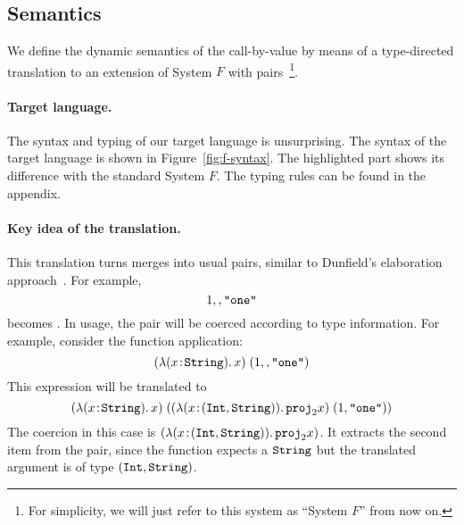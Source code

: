 \subsection{Semantics}

We define the dynamic semantics of the call-by-value \name by means of
a type-directed translation to an extension of System $F$ with pairs~\footnote{
  For simplicity, we will just refer to this system as ``System $F$''
  from now on.}.


\paragraph{Target language.}
The syntax and typing of our target language is unsurprising. The syntax of the
target language is shown in Figure~\ref{fig:f-syntax}. The highlighted part
shows its difference with the standard System $F$. The typing rules can be found
in the appendix.

\paragraph{Key idea of the translation.}
This translation turns merges into usual pairs, similar to Dunfield's
elaboration approach~\cite{dunfield2014elaborating}.
For example, \[ 1 ,, \texttt{"one"} \] becomes 
{}. In usage, the pair will be coerced according to type
information. For example, consider the function application: \[ (\lambda (x \!:\! \texttt{String}).\, x) \; (1 ,, \texttt{"one"}) \] This expression will be translated to \[ (\lambda (x \!:\! \texttt{String}).\, x) \; ((\lambda (x \!:\! (\texttt{Int}, \texttt{String})).\, {\texttt{proj}}_{2} x) \; (1, \texttt{"one"})) \] The coercion in this case is $(\lambda (x \!:\! (\texttt{Int}, \texttt{String})).\, {\texttt{proj}}_{2} x)$. It extracts the second item from the pair, since
the function expects a $\texttt{String}$ but the translated argument is of type $(\texttt{Int}, \texttt{String})$.



